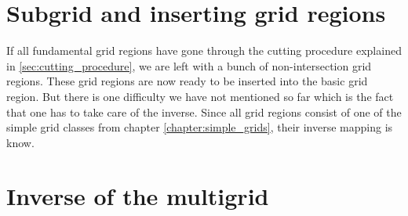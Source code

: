 \section{Subgrid and inserting grid regions}\label{sec:subgrids_and_insert}
If all fundamental grid regions have gone through the cutting procedure explained in \ref{sec:cutting_procedure}, we are left with a bunch of non-intersection grid regions. These grid regions are now ready to be inserted into the basic grid region. But there is one difficulty we have not mentioned so far which is the fact that one has to take care of the inverse. Since all grid regions consist of one of the simple grid classes from chapter \ref{chapter:simple_grids}, their inverse mapping is know. 

\section{Inverse of the multigrid}\label{sec:inverse_of_the_multigrid}



